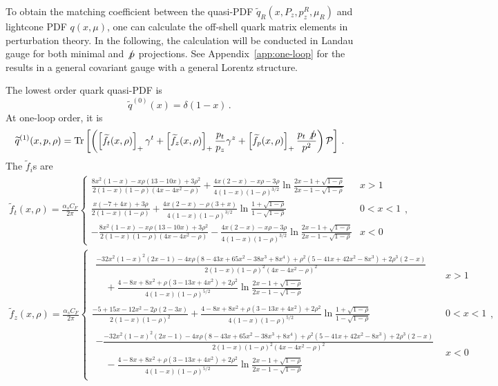 To obtain the matching coefficient  between the quasi-PDF $\widetilde{q}_R(x,P_z, p^R_z,\mu_R)$ and lightcone PDF $q(x,\mu)$, one  can calculate the  off-shell quark matrix elements in perturbation theory. In the following,  the calculation  will be conducted  in Landau gauge for both   minimal and $\slashed p$ projections. See Appendix~\ref{app:one-loop} for the results in a general covariant gauge with a general Lorentz structure.


The lowest order quark quasi-PDF is
\begin{equation}
\widetilde{q}^{(0)}(x)=\delta(1-x)\,.
\end{equation}
At one-loop order, it is
\begin{align}\label{eq:one_loop_quasiPDF}
\widetilde{q}^{(1)}(x,p,\rho)=\mbox{Tr}\left[\left(\left[\widetilde{f}_t(x,\rho)\right]_+\gamma^t+\left[\widetilde{f}_z(x,\rho)\right]_+\frac{p_t}{p_z}\gamma^z+\left[\widetilde{f}_p(x,\rho)\right]_+\frac{p_t\slashed{p}}{p^2}\right){\cal P}\right]\,.
\end{align}
The $\widetilde{f}_i$s are
\begin{align}
\widetilde{f}_t(x,\rho)=\frac{\alpha_s C_F}{2\pi}\left\{
\begin{array}{lc}
\frac{8x^2(1-x)-x\rho(13-10x)+3\rho^2}{2(1-x)(1-\rho)(4x-4x^2-\rho)}+\frac{4x(2-x)-x\rho-3\rho}{4(1-x)(1-\rho)^{3/2}}\ln\frac{2x-1+\sqrt{1-\rho}}{2x-1-\sqrt{1-\rho}} & x>1\\
%
\frac{x(-7+4x)+3\rho}{2(1-x)(1-\rho)}+\frac{4x(2-x)-\rho(3+x)}{4(1-x)(1-\rho)^{3/2}}\ln\frac{1+\sqrt{1-\rho}}{1-\sqrt{1-\rho}} & 0<x<1\\
%
-\frac{8x^2(1-x)-x\rho(13-10x)+3\rho^2}{2(1-x)(1-\rho)(4x-4x^2-\rho)}-\frac{4x(2-x)-x\rho-3\rho}{4(1-x)(1-\rho)^{3/2}}\ln\frac{2x-1+\sqrt{1-\rho}}{2x-1-\sqrt{1-\rho}} & x<0
\end{array}\right.,
\end{align}
\begin{align}
\widetilde{f}_z(x,\rho)=\frac{\alpha_s C_F}{2\pi}\left\{
\begin{array}{lc}
\begin{array}{l}
\frac{-32x^2(1-x)^2(2x-1)-4x\rho(8-43x+65x^2-38x^3+8x^4)+\rho^2(5-41x+42x^2-8x^3)+2\rho^3(2-x)}{2(1-x)(1-\rho)^2(4x-4x^2-\rho)^2}\\
\quad+\frac{4-8x+8x^2+\rho(3-13x+4x^2)+2\rho^2}{4(1-x)(1-\rho)^{5/2}}\ln\frac{2x-1+\sqrt{1-\rho}}{2x-1-\sqrt{1-\rho}}
\end{array} & x>1\\
\frac{-5+15x-12x^2-2\rho(2-3x)}{2(1-x)(1-\rho)^2}+\frac{4-8x+8x^2+\rho(3-13x+4x^2)+2\rho^2}{4(1-x)(1-\rho)^{5/2}}\ln\frac{1+\sqrt{1-\rho}}{1-\sqrt{1-\rho}} & 0<x<1\\
\begin{array}{l}
-\frac{-32x^2(1-x)^2(2x-1)-4x\rho(8-43x+65x^2-38x^3+8x^4)+\rho^2(5-41x+42x^2-8x^3)+2\rho^3(2-x)}{2(1-x)(1-\rho)^2(4x-4x^2-\rho)^2}\\
\quad-\frac{4-8x+8x^2+\rho(3-13x+4x^2)+2\rho^2}{4(1-x)(1-\rho)^{5/2}}\ln\frac{2x-1+\sqrt{1-\rho}}{2x-1-\sqrt{1-\rho}}
\end{array} & x<0
\end{array}\right.,
\end{align}
